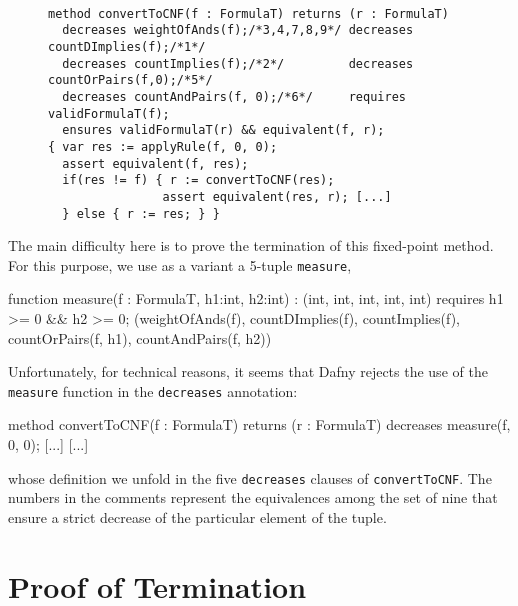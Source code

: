 \begin{figure}[H]
\begin{Verbatim}[fontsize=\small, baselinestretch=0.1]

method convertToCNF(f : FormulaT) returns (r : FormulaT)
  decreases weightOfAnds(f);/*3,4,7,8,9*/ decreases countDImplies(f);/*1*/
  decreases countImplies(f);/*2*/         decreases countOrPairs(f,0);/*5*/
  decreases countAndPairs(f, 0);/*6*/     requires validFormulaT(f);
  ensures validFormulaT(r) && equivalent(f, r);
{ var res := applyRule(f, 0, 0); 
  assert equivalent(f, res);
  if(res != f) { r := convertToCNF(res);
                assert equivalent(res, r); [...]
  } else { r := res; } }

\end{Verbatim}
\end{figure}
The main difficulty here is to prove the termination of this
fixed-point method. For this purpose, we use as a variant a 5-tuple
\texttt{measure}, %
\begin{dafny}
function measure(f : FormulaT, h1:int, h2:int) : (int, int, int, int, int)
  requires h1 >= 0 && h2 >= 0;
{
  (weightOfAnds(f), countDImplies(f), countImplies(f), 
  countOrPairs(f, h1), countAndPairs(f, h2))
}
\end{dafny}
Unfortunately, for technical reasons, it seems that Dafny rejects the
use of the \texttt{measure} function in the \texttt{decreases}
annotation:
\begin{dafny}
method convertToCNF(f : FormulaT) 
  returns (r : FormulaT)
  decreases measure(f, 0, 0);
  [...]
{
  [...]
}
\end{dafny}
whose definition we unfold in the five \texttt{decreases} clauses of
\texttt{convertToCNF}. The numbers in the comments represent the
equivalences among the set of nine that ensure a strict decrease of
the particular element of the tuple.

\section{Proof of Termination}
\label{sec:termination}

